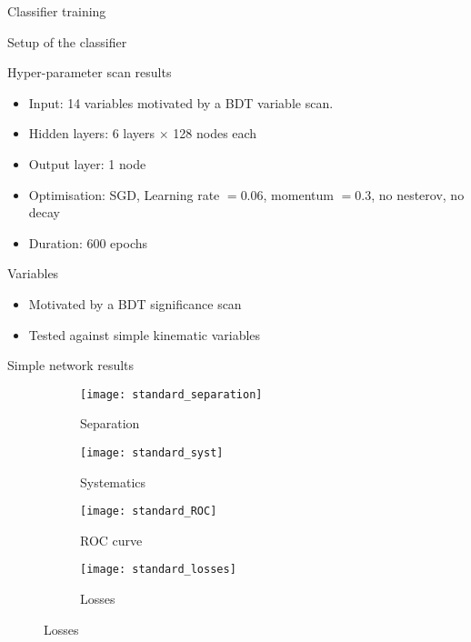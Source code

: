 \begin{frame}[c]
\begin{center}
\Huge Classifier training
\end{center}
\end{frame}

\begin{frame}{Setup of the classifier}
\begin{block}{Hyper-parameter scan results}
\begin{itemize}
\item Input: \num{14} variables motivated by a BDT variable scan.
\item Hidden layers: \num{6} \ELU layers $\times$ \num{128} nodes each
\item Output layer: \num{1} \SIGMOID node
\item Optimisation: SGD, Learning rate $=0.06$, momentum $=0.3$, no nesterov, no decay
\item Duration: 600 epochs
\end{itemize}
\end{block}
\begin{block}{Variables}
\begin{itemize}
    \item Motivated by a BDT significance scan
    \item Tested against simple kinematic variables
\end{itemize}
\end{block}
\end{frame}

\begin{frame}{Simple network results}
\vspace{-4mm}
\begin{figure}[htbp]
    \centering
    \begin{subfigure}[b]{0.4\textwidth}
        \texttt{[image: standard\_separation]}
        \caption{Separation}
        \label{fig:simple:final:sepa}
    \end{subfigure}
\quad
    \begin{subfigure}[b]{0.4\textwidth}
        \texttt{[image: standard\_syst]}
        \caption{Systematics}
        \label{fig:simple:final:syst}
    \end{subfigure}

    \begin{subfigure}[b]{0.4\textwidth}
		\texttt{[image: standard\_ROC]}
		\caption{ROC curve}
		\label{fig:simple:final:roc}
	\end{subfigure}
\quad
	\begin{subfigure}[b]{0.4\textwidth}
		\texttt{[image: standard\_losses]}
		\caption{Losses}
		\label{fig:simple:final:loss}
	\end{subfigure}
\end{figure}
\end{frame}